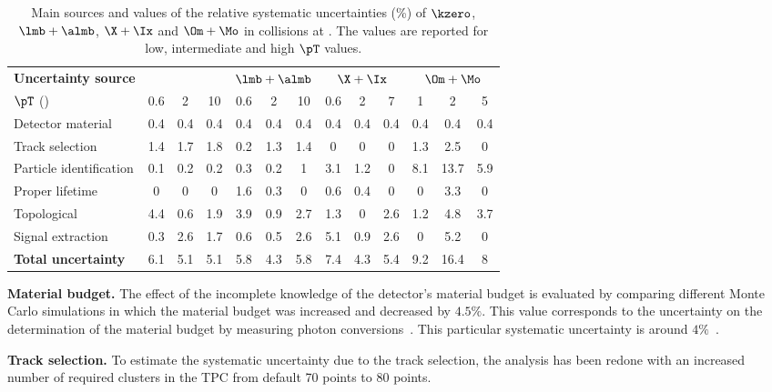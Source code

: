 \documentclass[ALICE,manyauthors]{cernphprep}
\begin{document}
\begin{table}[!ht]
	\begin{center}
		\caption{Main sources and values of the relative systematic uncertainties (\%) of $\kzero$, $\lmb + \almb$, $\X + \Ix$ and $\Om + \Mo$ in \pPb collisions at \fivenn.
			The values are reported for low, intermediate and high $\pT$ values.}
		\label{tab:pPbInclUncer}
		\begin{tabularx}{\textwidth}{@{} lCCCCCCCCCCCC @{}}
			\toprule
			\textbf{Uncertainty source} & 
			& 
			& 
			&  \\
			\cmidrule(lr){2-4} \cmidrule(lr){5-7} \cmidrule(lr){8-10} \cmidrule(lr){11-13}
			$\pT$ (\GeVc) & 0.6 & 2 &10  & 0.6 & 2 & 10    & 0.6 & 2 & 7   & 1& 2 & 5 \\
			\midrule
			Detector material& 0.4 & 0.4 & 0.4 & 0.4 & 0.4 & 0.4 & 0.4 & 0.4 & 0.4 & 0.4 & 0.4 & 0.4 \\
			Track selection & 1.4& 1.7& 1.8& 0.2& 1.3& 1.4& 0& 0& 0& 1.3& 2.5& 0\\
			Particle identification& 0.1& 0.2& 0.2& 0.3& 0.2& 1& 3.1&  1.2& 0& 8.1& 13.7& 5.9 \\
			Proper lifetime & 0& 0& 0& 1.6& 0.3& 0& 0.6& 0.4& 0& 0& 3.3& 0\\
			Topological & 4.4& 0.6& 1.9& 3.9& 0.9& 2.7& 1.3& 0& 2.6& 1.2& 4.8& 3.7\\
			Signal extraction& 0.3& 2.6& 1.7& 0.6& 0.5& 2.6& 5.1& 0.9& 2.6& 0& 5.2& 0\\
			\midrule
			\textbf{Total uncertainty}& 6.1& 5.1& 5.1& 5.8& 4.3& 5.8& 7.4& 4.3& 5.4& 9.2& 16.4& 8\\
			\bottomrule
		\end{tabularx}
	\end{center}
\end{table}

\textbf{Material budget.} The effect of the incomplete knowledge of the detector's material budget is evaluated by comparing different Monte Carlo simulations in which the material budget was increased and decreased by $4.5\%$.
This value corresponds to the uncertainty on the determination of the material budget by measuring photon conversions~\cite{Abelev:2014ffa}.
This particular systematic uncertainty is around $4\%$~\cite{Acharya:2020uxl}.

\textbf{Track selection.} To estimate the systematic uncertainty due to the track selection, the analysis has been redone with an increased number of required clusters in the TPC from default 70 points to 80 points.
\end{document}
